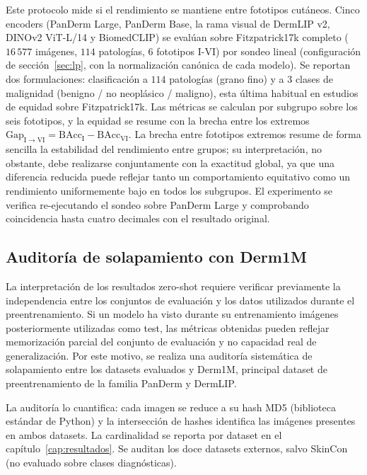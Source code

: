 Este protocolo mide si el rendimiento se mantiene entre fototipos
cutáneos. Cinco encoders (PanDerm Large, PanDerm Base, la rama
visual de DermLIP v2, DINOv2 ViT-L/14 y BiomedCLIP) se evalúan sobre
Fitzpatrick17k completo ($16\,577$ imágenes, $114$ patologías,
$6$ fototipos I-VI) por sondeo lineal (configuración de
sección~\ref{sec:lp}, con la normalización canónica de cada
modelo). Se reportan dos formulaciones: clasificación a $114$
patologías (grano fino) y a $3$ clases de malignidad
(benigno / no neoplásico / maligno), esta última habitual en
estudios de equidad sobre Fitzpatrick17k. Las métricas se calculan
por subgrupo sobre los seis fototipos, y la equidad se resume con la
brecha entre los extremos
$\mathrm{Gap}_{\mathrm{I}\to\mathrm{VI}} =
\mathrm{BAcc}_{\mathrm{I}} - \mathrm{BAcc}_{\mathrm{VI}}$. La
brecha entre fototipos extremos resume de forma sencilla la
estabilidad del rendimiento entre grupos; su interpretación, no
obstante, debe realizarse conjuntamente con la exactitud global, ya
que una diferencia reducida puede reflejar tanto un comportamiento
equitativo como un rendimiento uniformemente bajo en todos los
subgrupos. El experimento se verifica re-ejecutando el sondeo sobre
PanDerm Large y comprobando coincidencia hasta cuatro decimales con
el resultado original.

\subsection{Auditoría de solapamiento con Derm1M}
\label{sec:auditoria}

La interpretación de los resultados zero-shot requiere verificar
previamente la independencia entre los conjuntos de evaluación y los
datos utilizados durante el preentrenamiento. Si un modelo ha visto
durante su entrenamiento imágenes posteriormente utilizadas como
test, las métricas obtenidas pueden reflejar memorización parcial
del conjunto de evaluación y no capacidad real de generalización.
Por este motivo, se realiza una auditoría sistemática de
solapamiento entre los datasets evaluados y Derm1M, principal
dataset de preentrenamiento de la familia PanDerm y DermLIP.

La auditoría lo cuantifica: cada imagen se reduce
a su hash MD5 (biblioteca estándar de Python) y la intersección de
hashes identifica las imágenes presentes en ambos datasets. La
cardinalidad se reporta por dataset en el
capítulo~\ref{cap:resultados}. Se auditan los doce datasets
externos, salvo SkinCon (no evaluado sobre clases diagnósticas).


